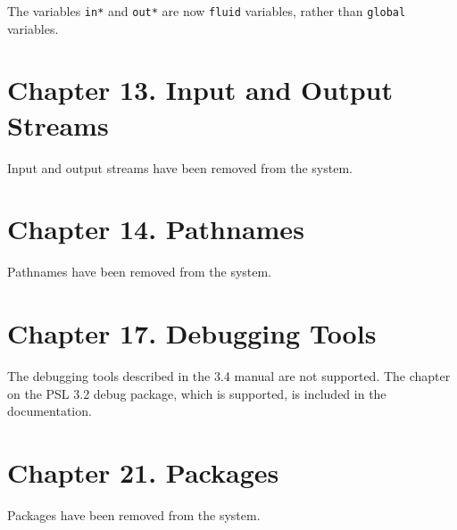 The variables {\tt in*} and {\tt out*} are now {\tt fluid} variables,
rather than {\tt global} variables.

\section{Chapter 13.  Input and Output Streams}

Input and output streams have been removed from the system.

\section{Chapter 14.  Pathnames}

Pathnames have been removed from the system.

\section{Chapter 17.  Debugging Tools}

The debugging tools described in the 3.4 manual are not supported.
The chapter on the PSL 3.2 debug package, which is supported, is included
in the documentation.

\section{Chapter 21.  Packages}

Packages have been removed from the system.




